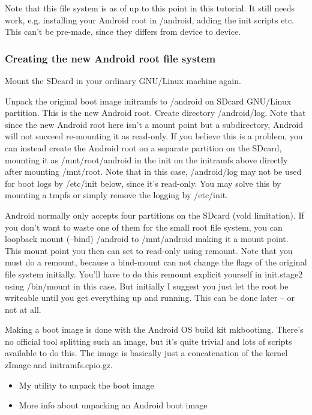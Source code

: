 Note that this file system is as of up to this point in this tutorial. It still
needs work, e.g. installing your Android root in /android, adding the init
scripts etc. This can't be pre-made, since they differs from device to device.

\subsubsection{Creating the new Android root file system}

Mount the SDcard in your ordinary GNU/Linux machine again.

Unpack the original boot image initramfs to /android on SDcard GNU/Linux
partition. This is the new Android root. Create directory /android/log. Note
that since the new Android root here isn't a mount point but a subdirectory,
Android will not succeed re-mounting it as read-only. If you believe this is a
problem, you can instead create the Android root on a separate partition on the
SDcard, mounting it as /mnt/root/android in the init on the initramfs above
directly after mounting /mnt/root. Note that in this case, /android/log may not
be used for boot logs by /etc/init below, since it's read-only. You may solve
this by mounting a tmpfs or simply remove the logging by /etc/init.

Android normally only accepts four partitions on the SDcard (vold limitation).
If you don't want to waste one of them for the small root file system, you can
loopback mount (--bind) /android to /mnt/android making it a mount point. This
mount point you then can set to read-only using remount. Note that you must do a
remount, because a bind-mount can not change the flags of the original file
system initially. You'll have to do this remount explicit yourself in
init.stage2 using /bin/mount in this case. But initially I suggest you just let
the root be writeable until you get everything up and running. This can be done
later -- or not at all.

Making a boot image is done with the Android OS build kit mkbootimg. There's no
official tool splitting such an image, but it's quite trivial and lots of
scripts available to do this. The image is basically just a concatenation of the
kernel zImage and initramfs.cpio.gz.

\begin{itemize}
  \item 
My utility to unpack the boot image
\item
More info about unpacking an Android boot image
\end{itemize}

